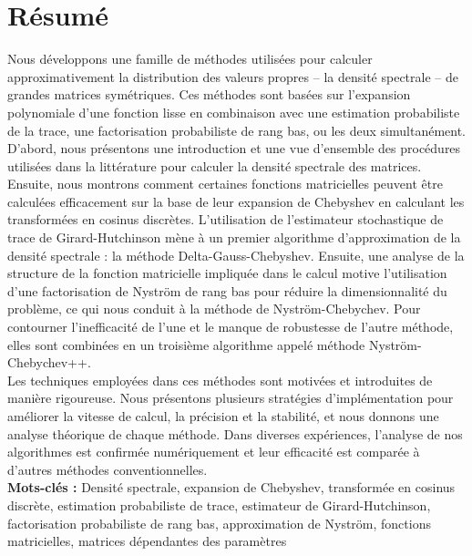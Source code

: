 \chapter*{Résumé}
\label{chp:0-resume}

Nous développons une famille de méthodes utilisées pour calculer approximativement
la distribution des valeurs propres -- la densité spectrale -- de grandes matrices symétriques. Ces méthodes sont basées
sur l'expansion polynomiale d'une fonction lisse en combinaison avec une estimation probabiliste
de la trace, une factorisation probabiliste de rang bas, ou les deux simultanément.\\

D'abord, nous présentons une introduction et une vue d'ensemble des procédures
utilisées dans la littérature pour calculer la densité spectrale des matrices. Ensuite, nous montrons
comment certaines fonctions matricielles peuvent être calculées efficacement sur
la base de leur expansion de Chebyshev en calculant les transformées en cosinus
discrètes. L'utilisation de l'estimateur stochastique de trace de Girard-Hutchinson
mène à un premier algorithme d'approximation de la densité spectrale : la
méthode Delta-Gauss-Chebyshev. Ensuite, une analyse de la structure de la
fonction matricielle impliquée dans le calcul motive l'utilisation d'une factorisation de
Nystr\"om de rang bas pour réduire la dimensionnalité du problème, ce qui
nous conduit à la méthode de Nystr\"om-Chebychev. Pour contourner l'inefficacité
de l'une et le manque de robustesse de l'autre méthode, elles sont combinées en
un troisième algorithme appelé méthode Nystr\"om-Chebychev++.\\

Les techniques employées dans ces méthodes sont motivées et introduites de manière
rigoureuse. Nous présentons plusieurs stratégies d'implémentation pour améliorer
la vitesse de calcul, la précision et la stabilité, et nous donnons une analyse
théorique de chaque méthode. Dans diverses expériences, l'analyse de nos algorithmes
est confirmée numériquement et leur efficacité est comparée à d'autres méthodes
conventionnelles.\\

\textbf{Mots-clés :} Densité spectrale, expansion de Chebyshev,
transformée en cosinus discrète, estimation probabiliste de trace,
estimateur de Girard-Hutchinson, factorisation probabiliste de rang bas, approximation de Nystr\"om,
fonctions matricielles, matrices dépendantes des paramètres

